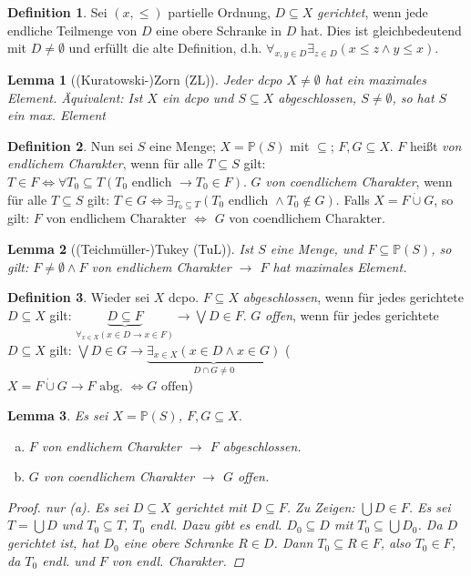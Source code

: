 \documentclass[headsepline=true,DIV=11]{scrartcl}
\newtheorem*{lemma}{Lemma}
\theoremstyle{definition}
\newtheorem*{definition}{Definition}
\begin{document}

\begin{definition}
	Sei $(x,\le)$ partielle Ordnung, $D\subseteq X$ {\em gerichtet}, wenn jede endliche Teilmenge von $D$ eine obere Schranke in $D$ hat.
	Dies ist gleichbedeutend mit $D\neq\emptyset$ und erfüllt die alte Definition, d.h. $\forall_{x,y\in D}\exists_{z\in D}(x\le z \land y\le x)$.
\end{definition}

\begin{lemma}[(Kuratowski-)Zorn (ZL)]
	Jeder dcpo $X\neq \emptyset$ hat ein maximales Element.
	Äquivalent: Ist $X$ ein dcpo und $S\subseteq X$ abgeschlossen, $S\neq \emptyset$, so hat $S$ ein max. Element
\end{lemma}

\begin{definition}
	Nun sei $S$ eine Menge; $X=\mathbb P(S)$ mit $\subseteq$; $F,G\subseteq X$.
	$F$ heißt {\em von endlichem Charakter}, wenn für alle $T\subseteq S$ gilt: $T\in F\iff \forall T_0\subseteq T(T_0 \text{ endlich } \to T_0\in F)$.
	$G$ {\em von coendlichem Charakter}, wenn für alle $T\subseteq S$ gilt: $T\in G\iff \exists_{T_0\subseteq T}(T_0 \text{ endlich } \land T_0\notin G)$.
	Falls $X=F\dot\cup G$, so gilt: $F$ von endlichem Charakter $\iff$ $G$ von coendlichem Charakter.
\end{definition}

\begin{lemma}[(Teichmüller-)Tukey (TuL)]
	Ist $S$ eine Menge, und $F\subseteq\mathbb P(S)$, so gilt: $F\neq\emptyset \land F$ von endlichem Charakter $\to$ $F$ hat maximales Element.
\end{lemma}

\begin{definition}
	Wieder sei $X$ dcpo. 
	$F\subseteq X$ {\em abgeschlossen}, wenn für jedes gerichtete $D\subseteq X$ gilt: 
	$\underbrace{D\subseteq F}_{\forall_{x\in X}(x\in D\to x\in F)}\to \bigvee D\in F$.
	$G$ {\em offen}, wenn für jedes gerichtete $D\subseteq X$ gilt: 
	$\bigvee D\in G\to \underbrace{\exists_{x\in X}(x\in D \land x\in G)}_{D\cap G\neq 0}$
	($X=F\dot\cup G\to F \text{ abg. } \iff G \text{ offen}$)
\end{definition}

\begin{lemma}
	Es sei $X=\mathbb P(S)$, $F,G\subseteq X$.
	\begin{enumerate}[(a)]
		\item $F$ von endlichem Charakter $\to$ $F$ abgeschlossen.
		\item $G$ von coendlichem Charakter $\to$ $G$ offen.
	\end{enumerate}
	\begin{proof}
		nur (a). Es sei $D\subseteq X$ gerichtet mit $D\subseteq F$.
		Zu Zeigen: $\bigcup D\in F$. 
		Es sei $T=\bigcup D$ und $T_0\subseteq T$, $T_0$ endl.
		Dazu gibt es endl. $D_0\subseteq D$ mit $T_0\subseteq\bigcup D_0$.
		Da $D$ gerichtet ist, hat $D_0$ eine obere Schranke $R\in D$.
		Dann $T_0\subseteq R\in F$, also $T_0\in F$, da $T_0$ endl. und $F$ von endl. Charakter.
	\end{proof}
\end{lemma}
\end{document}
